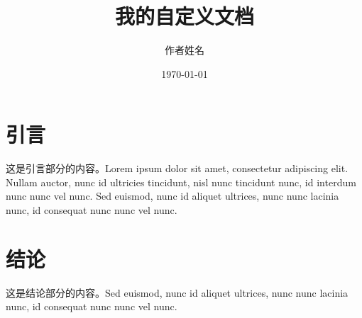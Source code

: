 \documentclass[nodate]{myclass}  %
\title{我的自定义文档}
\author{作者姓名}
\date{\today}
\begin{document}
\maketitle

\section{引言}
这是引言部分的内容。Lorem ipsum dolor sit amet, consectetur adipiscing elit. Nullam auctor, nunc id ultricies tincidunt, nisl nunc tincidunt nunc, id interdum nunc nunc vel nunc. Sed euismod, nunc id aliquet ultrices, nunc nunc lacinia nunc, id consequat nunc nunc vel nunc. 

\section{结论}
这是结论部分的内容。Sed euismod, nunc id aliquet ultrices, nunc nunc lacinia nunc, id consequat nunc nunc vel nunc. 
\end{document}
